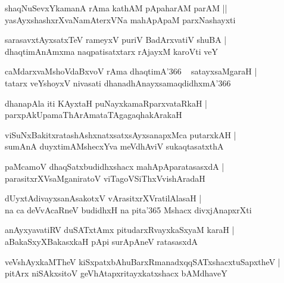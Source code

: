 \documentclass[twoside,12pt,openright]{book}
\newcounter{shloka}[chapter]
\begin{document}
\begin{shloka}%
shaqNuSevxYkamanA rAma kathAM pApaharAM parAM ||\\
yasAyxshashxrXvaNamAterxVNa mahApApaM parxNashayxti
\end{shloka}

\begin{shloka}%
sarasavxtAyxsatxTeV rameyxV puriV BadArxvatiV shuBA |\\
dhaqtimAnAmxma naqpatisatxtarx rAjayxM karoVti veY 
\end{shloka}

\begin{shloka}%
caMdarxvaMshoVdaBxvoV rAma dhaqtimA\char'366 ~ satayxsaMgaraH |\\
tatarx veYshoyxV nivasati dhanadhAnayxsamaqdidhxmA\char'366
\end{shloka}

\begin{shloka}%
dhanapAla iti KAyxtaH puNayxkamaRparxvataRkaH |\\
parxpAkUpamaThArAmataTAgagaqhakArakaH
\end{shloka}

\begin{shloka}%
viSuNxBakitxratashAshxnatxsatxsAyxsanapxMca putarxkAH |\\
sumAnA duyxtimAMshecxYva meVdhAviV sukaqtasatxthA
\end{shloka}

\begin{shloka}%
paMcamoV dhaqSatxbudidhxshacx mahApAparatasasxdA |\\
parasitxrXVsaMganiratoV viTagoVSiThxVvishAradaH
\end{shloka}

\begin{shloka}%
dUyxtAdivayxsanAsakotxV vArasitxrXVratilAlasaH |\\
na ca deVvAcaRneV budidhxH na pita\char'365 Mshacx divxjAnapxrXti
\end{shloka}

\begin{shloka}%
anAyxyavatiRV duSATxtAmx pitudarxRvayxkaSxyaM karaH |\\
aBakaSxyXBakasxkaH pApi surApAneV ratasasxdA
\end{shloka}

\begin{shloka}%
veVshAyxkaMTheV kiSxpatxbAhuBarxRmanadxqqSATxshacxtuSapxtheV |\\
pitArx niSAkxsitoV geVhAtapxritayxkatxshacx bAMdhaveY
\end{shloka}
\end{document}
